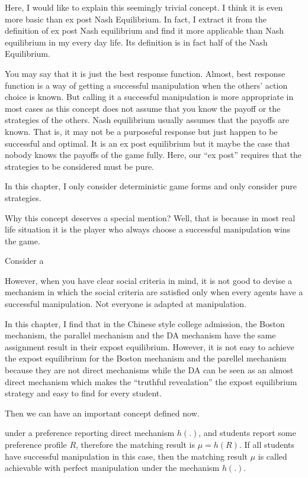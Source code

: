 Here, I would like to explain this seemingly trivial concept. I think it is even more basic than ex post Nash Equilibrium. In fact, I extract it from the definition of ex post Nash equilibrium and find it more applicable than Nash equilibrium in my every day life. Its definition is in fact half of the Nash Equilibrium.

You may say that it is just the best response function. Almost, best response function is a way of getting a successful manipulation when the others' action choice is known. But calling it a successful manipulation is more appropriate in most cases as this concept does not assume that you know the payoff or the strategies of the others. 
Nash equilibrium usually assumes that the payoffs are known. That is, it may not be a purposeful response but just happen to be successful and optimal. It is an ex post equilibrium but it maybe the case that 
nobody knows the payoffs of the game fully. Here, our ``ex post'' requires that the strategies to be considered must be pure.

In this chapter, I only consider deterministic game forms and only consider pure strategies. 

Why this concept deserves a special mention? Well, that is because in most real life situation it is the player who always choose a successful manipulation wins the game. 
\begin{example}
Consider a 
\end{example}

 
However, when you have clear social criteria in mind, it is not good to devise a mechanism in which the social criteria are satisfied only when every agents have a successful manipulation. Not everyone 
is adapted at manipulation.


In this chapter, I find that in the Chinese style college admission, the Boston mechanism, the parallel mechanism and the DA mechanism have the same assignment result in their expost equilibrium. However, it is not 
easy to achieve the expost equilibrium for the Boston mechanism and the parellel mechanism because they are not direct mechanisms while the DA can be seen as an almost direct mechanism which makes the ``truthful
revealation'' the expost equilibrium strategy and easy to find for every student.

Then we can have an important concept defined now.
\begin{definition}
under a preference reporting direct mechanism $h(.)$, and students report some preference profile $R$, therefore the matching result is $\mu=h(R)$.
If all students have successful manipulation in this case, then the matching result $\mu$ is called achievable with perfect manipulation under the mechanism $h(.)$.
\end{definition}

